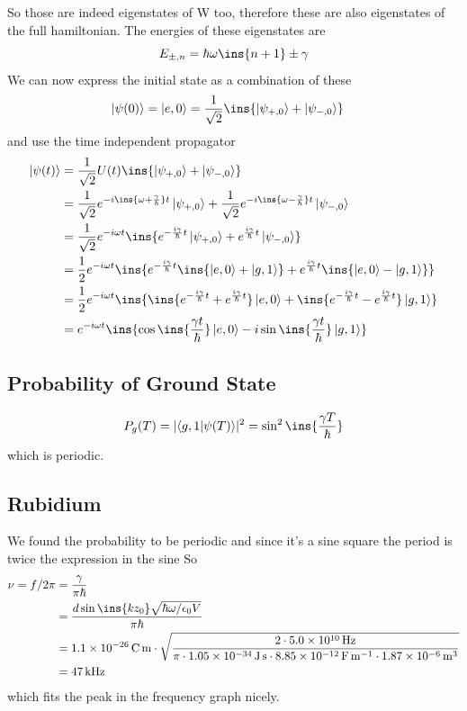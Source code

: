 So those are indeed eigenstates of W too, therefore these are also eigenstates of the full hamiltonian. The energies of these eigenstates are
\begin{equation}
    E_{\pm,n} = \hbar\omega\ins{n+1}\pm\gamma
\end{equation}
We can now express the initial state as a combination of these
\begin{align}
    \ket{\psi(0)} &= \ket{e,0} = \frac{1}{\sqrt{2}}\ins{\ket{\psi_{+,0}}+\ket{\psi_{-,0}}}
\end{align}
and use the time independent propagator
\begin{align}
    \ket{\psi(t)} &= \frac{1}{\sqrt{2}}U(t)\ins{\ket{\psi_{+,0}}+\ket{\psi_{-,0}}}\\
    &= \frac{1}{\sqrt{2}}e^{-i\ins{\omega+\frac{\gamma}{\hbar}}t}\ket{\psi_{+,0}}+\frac{1}{\sqrt{2}}e^{-i\ins{\omega-\frac{\gamma}{\hbar}}t}\ket{\psi_{-,0}}\\
    &= \frac{1}{\sqrt{2}}e^{-i\omega t}\ins{e^{-\frac{i\gamma}{\hbar}t}\ket{\psi_{+,0}}+e^{\frac{i\gamma}{\hbar}t}\ket{\psi_{-,0}}}\\
    &= \frac{1}{2}e^{-i\omega t}\ins{e^{-\frac{i\gamma}{\hbar}t}\ins{\ket{e,0}+\ket{g,1}}+e^{\frac{i\gamma}{\hbar}t}\ins{\ket{e,0}-\ket{g,1}}}\\
    &= \frac{1}{2}e^{-i\omega t}\ins{\ins{e^{-\frac{i\gamma}{\hbar}t}+e^{\frac{i\gamma}{\hbar}t}}\ket{e,0}+\ins{e^{-\frac{i\gamma}{\hbar}t}-e^{\frac{i\gamma}{\hbar}t}}\ket{g,1}}\\
    &= e^{-i\omega t}\ins{\cos\ins{\frac{\gamma t}{\hbar}}\ket{e,0}-i\sin\ins{\frac{\gamma t}{\hbar}}\ket{g,1}}
\end{align}
\subsection{Probability of Ground State}
\begin{equation}
    P_g(T) = \lvert\braket{g,1\vert \psi(T)}\rvert^2=\sin^2\ins{\frac{\gamma T}{\hbar}}
\end{equation}
which is periodic.
\subsection{Rubidium}
We found the probability to be periodic and since it's a sine square the period is twice the expression in the sine So
\begin{align}
    \nu = f/2\pi &= \frac{\gamma}{\pi\hbar}\\
    &= \frac{d\sin\ins{kz_0}\sqrt{\hbar\omega/\epsilon_0V}}{\pi\hbar}\\
    &= \qty{1.1e-26}{\coulomb.\meter}\cdot\sqrt{\frac{2\cdot\qty{5.0e10}{\hertz}}{\pi\cdot\qty{1.05e-34}{\joule.\second}\cdot\qty{8.85e-12}{\farad\per\meter}\cdot\qty{1.87e-6}{\meter\cubed}}}\\
    &= \qty{47}{\kilo\hertz}
\end{align}
which fits the peak in the frequency graph nicely.